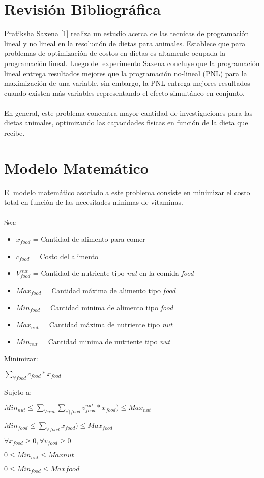 \documentclass[11pt]{article}
\begin{document}
\section*{Revisión Bibliográfica}
Pratiksha Saxena [1] realiza un estudio acerca de las tecnicas de programación lineal y no lineal en la resolución de dietas para animales. Establece que para problemas de optimización de costos en dietas es altamente ocupada la programación lineal. Luego del experimento Saxena concluye que la programación lineal entrega resultados mejores que la programación no-lineal (PNL) para la maximización de una variable, sin embargo, la PNL entrega mejores resultados cuando existen más variables representando el efecto simultáneo en conjunto.\\\\En general, este problema concentra mayor cantidad de investigaciones para las dietas animales, optimizando las capacidades fisicas en función de la dieta que recibe. 
\newpage
\section*{Modelo Matemático}
El modelo matemático asociado a este problema consiste en minimizar el costo total en función de las necesitades minimas de vitaminas.\\\\
Sea:
\begin{itemize}
\item $x_{food}$ = Cantidad de alimento para comer
\item $c_{food}$ = Costo del alimento
\item $V_{food}^{nut}$ = Cantidad de nutriente tipo \emph{nut} en la comida \emph{food} 
\item $Max_{food}$ = Cantidad máxima de alimento tipo \emph{food}
\item $Min_{food}$ = Cantidad minima de alimento tipo \emph{food}
\item $Max_{nut}$ = Cantidad máxima de nutriente tipo \emph{nut}
\item $Min_{nut}$ = Cantidad minima de nutriente tipo \emph{nut}
\end{itemize}
Minimizar: \begin{center}$\sum_{\forall food}c_{food}*x_{food}$\end{center}
Sujeto a:
\begin{center}$Min_{nut}\leq\sum_{\forall nut}\sum_{\forall (food}v_{food}^{nut}*x_{food})\leq Max_{nut}$\end{center}
\begin{center}$Min_{food}\leq\sum_{\forall {food}}x_{food})\leq Max_{food}$\end{center}
\begin{center}$\forall x_{food}\geq 0, \forall v_{food} \geq 0$\end{center}
\begin{center}$0 \leq Min_{nut} \leq Max{nut}$\end{center}
\begin{center}$0 \leq Min_{food} \leq Max{food}$\end{center}
\end{document}
